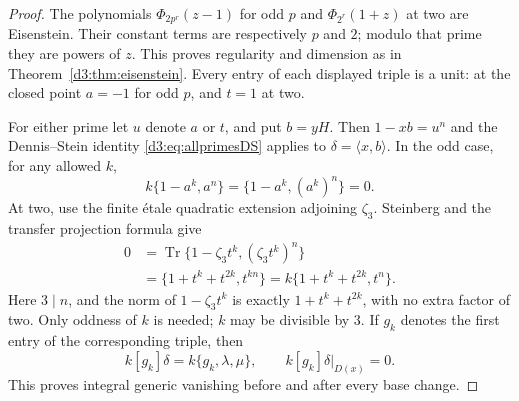 \begin{proof}
The polynomials $\Phi_{2p^r}(z-1)$ for odd $p$ and
$\Phi_{2^r}(1+z)$ at two are Eisenstein.
Their constant terms are respectively $p$ and $2$; modulo that
prime they are powers of $z$. This proves regularity and dimension
as in Theorem~\ref{d3:thm:eisenstein}.
Every entry of each displayed triple is a unit: at the closed
point $a=-1$ for odd $p$, and $t=1$ at two.

For either prime let $u$ denote $a$ or $t$, and put $b=yH$.
Then $1-xb=u^n$ and the Dennis--Stein identity
\eqref{d3:eq:allprimesDS} applies to
$\delta=\langle x,b\rangle$.
In the odd case, for any allowed $k$,
\[
 k\{1-a^k,a^n\}=\{1-a^k,(a^k)^n\}=0.
\]
At two, use the finite \'etale quadratic extension adjoining
$\zeta_3$. Steinberg and the transfer projection formula give
\[
 \begin{split}
 0&=\operatorname{Tr}\{1-\zeta_3t^k,(\zeta_3t^k)^n\}\\
  &=\{1+t^k+t^{2k},t^{kn}\}
   =k\{1+t^k+t^{2k},t^n\}.
 \end{split}
\]
Here $3\mid n$, and the norm of $1-\zeta_3t^k$ is exactly
$1+t^k+t^{2k}$, with no extra factor of two.
Only oddness of $k$ is needed; $k$ may be divisible by $3$.
If $g_k$ denotes the first entry of the corresponding triple, then
\[
 k[g_k]\delta=k\{g_k,\lambda,\mu\},\qquad
 k[g_k]\delta|_{D(x)}=0.
\]
This proves integral generic vanishing before and after every base change.


\end{proof}
